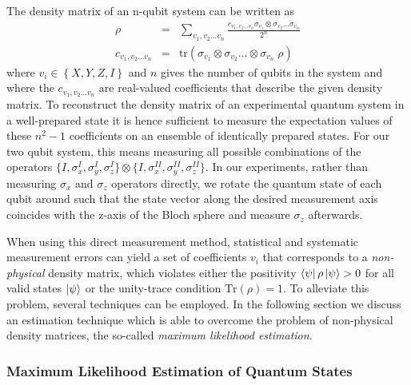 \smallskip

The density matrix of an n-qubit system can be written as
%
\begin{eqnarray}
\rho & = & \sum\limits_{v_1,v_2\hdots v_n} \frac{c_{v_1,v_2\hdots v_n} \sigma_{v_1}\otimes \sigma_{v_2}\hdots \sigma_{v_n}}{2^n} \label{eq:state_tomography_state_representation} \\
c_{v_1,v_2\hdots v_n} & = & \mathrm{tr}\left(\sigma_{v_1}\otimes \sigma_{v_2}\hdots \otimes\sigma_{v_n} \; \rho \right)  \label{eq:state_tomography_coefficients}
\end{eqnarray}
%
where $v_i \in \left\{ X,Y,Z,I\right\}$ and $n$ gives the number of qubits in the system and where the $c_{v_1,v_2\hdots v_n}$ are real-valued coefficients that describe the given density matrix. To reconstruct the density matrix of an experimental quantum system in a well-prepared state it is hence sufficient to measure the expectation values of these $n^2-1$ coefficients on an ensemble of identically prepared states. For our two qubit system, this means measuring all possible combinations of the operators $\{I,\sigma_x^I,\sigma_y^I,\sigma_z^I\}\otimes\{I,\sigma_x^{II},\sigma_y^{II},\sigma_z^{II}\}$. In our experiments, rather than measuring $\sigma_x$ and $\sigma_z$ operators directly, we rotate the quantum state of each qubit around such that the state vector along the desired measurement axis coincides with the z-axis of the Bloch sphere and measure $\sigma_z$ afterwards.

When using this direct measurement method, statistical and systematic measurement errors can yield a set of coefficients $v_i$ that corresponds to a {\it non-physical} density matrix, which violates either the positivity $\left< \psi \right|\rho\left| \psi \right> > 0$ for all valid states $\left| \psi \right>$ or the unity-trace condition $\mathrm{Tr}(\rho)=1$. To alleviate this problem, several techniques can be employed. In the following section we discuss an estimation technique which is able to overcome the problem of non-physical density matrices, the so-called {\it maximum likelihood estimation}.

\subsubsection{Maximum Likelihood Estimation of Quantum States}

